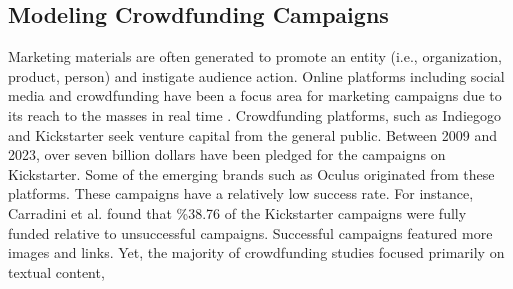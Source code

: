 \subsection{Modeling Crowdfunding Campaigns}
\label{sec:modeling-social-media}
\vspace{-1mm}
Marketing materials are often generated to promote an entity (i.e., organization, product, person) and 
instigate audience action. Online platforms including social media and crowdfunding have been a focus area for marketing campaigns due to its reach to the masses in real time \cite{kursuncu2019predictive}. Crowdfunding platforms, such as Indiegogo and Kickstarter %
seek venture capital from the general public.
Between 2009 and 2023, over seven billion dollars have been pledged for the campaigns on Kickstarter. Some of the emerging brands such as Oculus \cite{Carradini2023-ka} originated from these platforms.
These campaigns have a relatively low success rate. For instance, Carradini et al. \cite{Carradini2023-ka} 
found that \%38.76 of the Kickstarter campaigns were fully funded relative to unsuccessful campaigns.   Successful campaigns featured more images and links. Yet, the majority of crowdfunding studies focused primarily on textual content, 
